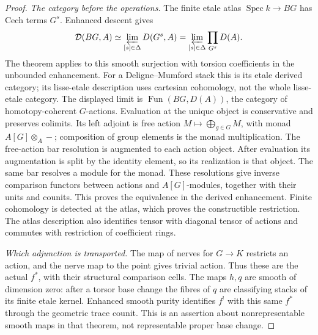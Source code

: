 \documentclass[11pt]{article}
\theoremstyle{definition}
\theoremstyle{remark}
\begin{document}
\begin{proof}
\emph{The category before the operations.}
The finite etale atlas $\operatorname{Spec}k\to BG$ has Cech terms
$G^s$.  Enhanced descent
\cite[Theorem 6.2.13(1)]{LiuZhengEnhanced} gives
\[
 \mathcal D(BG,A)\simeq
 \varprojlim_{[s]\in\Delta}D(G^s,A)
 =\varprojlim_{[s]\in\Delta}\prod_{G^s}D(A).
\]
The theorem applies to this smooth surjection with torsion
coefficients in the unbounded enhancement.  For a Deligne--Mumford
stack this is its etale derived category; its lisse-etale description
uses cartesian cohomology, not the whole lisse-etale category.
The displayed limit is $\operatorname{Fun}(BG,D(A))$, the category
of homotopy-coherent $G$-actions.  Evaluation at the unique object is
conservative and preserves colimits.  Its left adjoint is free action
$M\mapsto\bigoplus_{g\in G}M$, with monad $A[G]\otimes_A-$;
composition of group elements is the monad multiplication.
The free-action bar resolution is augmented to each action object.
After evaluation its augmentation is split by the identity element,
so its realization is that object.  The same bar resolves a module
for the monad.  These resolutions give inverse comparison functors
between actions and $A[G]$-modules, together with their units and
counits.  This proves the equivalence in the derived enhancement.  Finite cohomology is detected
at the atlas, which proves the constructible restriction.
The atlas description also identifies tensor with diagonal tensor
of actions and commutes with restriction of coefficient rings.

\emph{Which adjunction is transported.}
The map of nerves for $G\to K$ restricts an action, and the nerve
map to the point gives trivial action.  Thus these are the actual
$f^*$, with their structural comparison cells.  The maps $h,q$ are
smooth of dimension zero: after a torsor base change the fibres of
$q$ are classifying stacks of its finite etale kernel.  Enhanced
smooth purity \cite[Theorem 6.2.9(2)]{LiuZhengEnhanced} identifies
$f^!$ with this same $f^*$ through the geometric trace counit.
This is an assertion about nonrepresentable smooth maps in that
theorem, not representable proper base change.


\end{proof}
\end{document}

